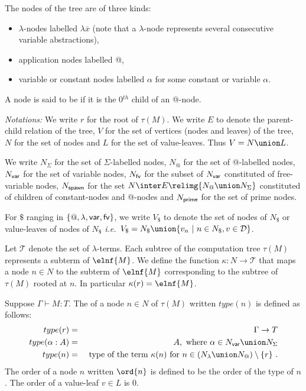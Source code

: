 The nodes of the tree are of three kinds:
\begin{itemize}
\item $\lambda$-nodes labelled $\lambda \overline{x}$ (note that a $\lambda$-node represents several consecutive variable abstractions),
\item application nodes labelled @,
\item variable or constant nodes labelled $\alpha$ for some constant or variable $\alpha$.
\end{itemize}
A node is said to be  if it is the 0$^{th}$ child of an @-node.
\bigskip

\emph{Notations:} We write $r$ for the root of $\tau(M)$. We write
$E$ to denote the parent-child relation of the tree, $V$ for the set
of vertices (nodes and leaves) of the tree, $N$ for the set of nodes
and $L$ for the set of value-leaves. Thus $V = N \union L$.

We write $N_\Sigma$ for the set of $\Sigma$-labelled nodes, $N_@$ for the set
of @-labelled nodes, $N_{\sf var}$ for the set of variable nodes,
$N_{\sf fv}$ for the subset of $N_{\sf var}$ constituted of free-variable
nodes, $N_{\sf spawn}$ for the set $N \inter E \relimg{N_@ \union N_\Sigma}$ constituted of children of constant-nodes and @-nodes and $N_{\sf prime}$ for the set of prime nodes.

For $\$$ ranging in $\{@, \lambda, {\sf var}, {\sf fv} \}$,
we write $V_\$$ to denote the set of nodes of $N_\$$ or value-leaves of nodes of $N_\$$
{\it i.e.}\ $V_\$ = N_\$ \union \{ v_n \ | \ n \in N_\$, v \in \mathcal{D} \}$.


Let $\mathcal{T}$ denote the set of $\lambda$-terms.
Each subtree of the computation tree $\tau(M)$ represents a subterm of $\elnf{M}$.
We define the function $\kappa : N \rightarrow \mathcal{T}$ that maps a node $n \in N$ to the subterm of $\elnf{M}$
corresponding to the subtree of $\tau(M)$ rooted at $n$.
In particular $\kappa(r) = \elnf{M}$.

\begin{definition}
\label{def:nodeorder}
Suppose $\Gamma \vdash M : T$.
The  of a node $n \in N$ of $\tau(M)$ written $type(n)$ is defined as follows:
\begin{eqnarray*}
type(r) &=& \Gamma \rightarrow T \\
type(\alpha:A) &=& A, \mbox{ where $\alpha \in N_{\sf var} \union N_\Sigma$} \\
type(n) &=& \hbox{ type of the term $\kappa(n)$ for $n \in (N_\lambda \union N_@) \setminus \{r \}$\ .}
\end{eqnarray*}
The order of a node $n$ written $\ord{n}$ is defined to be the order
of the type of $n$. The order of a value-leaf $v \in L$ is $0$.
\end{definition}

